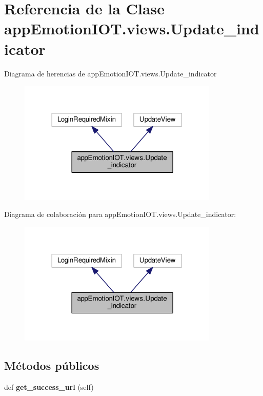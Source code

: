 \hypertarget{classappEmotionIOT_1_1views_1_1Update__indicator}{}\section{Referencia de la Clase app\+Emotion\+I\+O\+T.\+views.\+Update\+\_\+indicator}
\label{classappEmotionIOT_1_1views_1_1Update__indicator}


Diagrama de herencias de app\+Emotion\+I\+O\+T.\+views.\+Update\+\_\+indicator
\nopagebreak
\begin{figure}[H]
\begin{center}
\leavevmode
\includegraphics[width=270pt]{classappEmotionIOT_1_1views_1_1Update__indicator__inherit__graph}
\end{center}
\end{figure}


Diagrama de colaboración para app\+Emotion\+I\+O\+T.\+views.\+Update\+\_\+indicator\+:
\nopagebreak
\begin{figure}[H]
\begin{center}
\leavevmode
\includegraphics[width=270pt]{classappEmotionIOT_1_1views_1_1Update__indicator__coll__graph}
\end{center}
\end{figure}
\subsection*{Métodos públicos}
\begin{DoxyCompactItemize}
\item 
def {\bfseries get\+\_\+success\+\_\+url} (self)\hypertarget{classappEmotionIOT_1_1views_1_1Update__indicator_ab64ffdcc5cd2fc3af5452aec6c5c9ebc}{}\label{classappEmotionIOT_1_1views_1_1Update__indicator_ab64ffdcc5cd2fc3af5452aec6c5c9ebc}

\end{DoxyCompactItemize}

